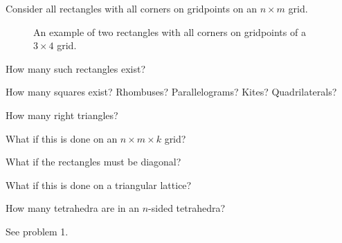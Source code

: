 \documentclass{article}
\begin{document}
Consider all rectangles with all corners on gridpoints on an $n \times m$ grid.
\begin{figure}[!h]
  \centering
  \caption{
    An example of two rectangles with all corners on gridpoints of a
    $3 \times 4$ grid.
  }
\end{figure}

\begin{question}
  How many such rectangles exist?
\end{question}
\begin{related}
  \item How many squares exist? Rhombuses? Parallelograms? Kites? Quadrilaterals?
  \item How many right triangles?
  \item What if this is done on an $n \times m \times k$ grid?
  \item What if the rectangles must be diagonal?
  \item What if this is done on a triangular lattice?
  \item How many tetrahedra are in an $n$-sided tetrahedra?
\end{related}
\begin{references}
  \item See problem 1.
\end{references}
\end{document}
